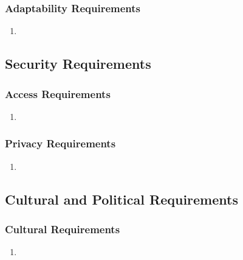 \documentclass[english]{article}
\begin{document}
\subsubsection{Adaptability Requirements}
\label{ssub:adaptability_requirements}
\begin{enumerate}[{MAR}1. ]
\item
\end{enumerate}


\subsection{Security Requirements}
\label{sub:security_requirements}

\subsubsection{Access Requirements}
\label{ssub:access_requirements}
\begin{enumerate}[{SAR}1. ]
\item
\end{enumerate}
\subsubsection{Privacy Requirements}
\label{ssub:privacy_requirements}
\begin{enumerate}[{SPR}1. ]
\item
\end{enumerate}


\subsection{Cultural and Political Requirements}
\label{sub:cultural_and_political_requirements}

\subsubsection{Cultural Requirements}
\label{ssub:cultural_requirements}
\begin{enumerate}[{CCR}1. ]
\item
\end{enumerate}

\end{document}
